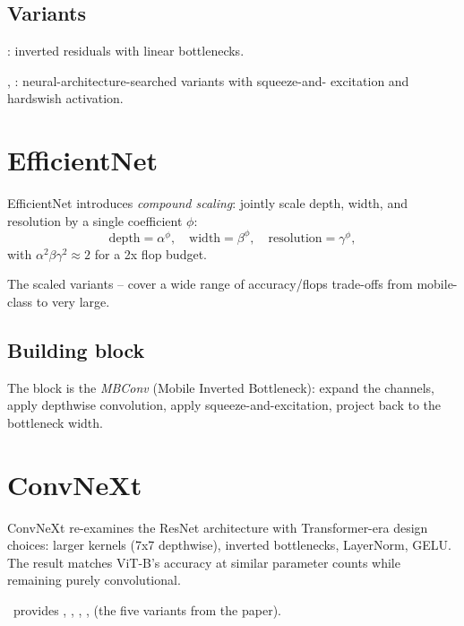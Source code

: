 \subsection{Variants}
\label{ssec:vision_cnn:mobilenet_variants}

: inverted residuals with linear bottlenecks.

, :
neural-architecture-searched variants with squeeze-and-
excitation and hardswish activation.

\section{EfficientNet}
\label{sec:vision_cnn:efficientnet}

EfficientNet \cite{tan_efficientnet_2019} introduces
\emph{compound scaling}: jointly scale depth, width, and
resolution by a single coefficient $\phi$:
\[
\text{depth} = \alpha^\phi, \quad
\text{width} = \beta^\phi, \quad
\text{resolution} = \gamma^\phi,
\]
with $\alpha^2 \beta \gamma^2 \approx 2$ for a 2x flop budget.

The scaled variants --
cover a wide range of accuracy/flops trade-offs from
mobile-class to very large.

\subsection{Building block}
\label{ssec:vision_cnn:efficientnet_block}

The block is the \emph{MBConv} (Mobile Inverted Bottleneck):
expand the channels, apply depthwise convolution, apply
squeeze-and-excitation, project back to the bottleneck width.

\section{ConvNeXt}
\label{sec:vision_cnn:convnext}

ConvNeXt \cite{liu_convnext_2022} re-examines the ResNet
architecture with Transformer-era design choices: larger
kernels (7x7 depthwise), inverted bottlenecks, LayerNorm,
GELU. The result matches ViT-B's accuracy at similar parameter
counts while remaining purely convolutional.

\Lucid\ provides , ,
, ,
 (the five variants from the paper).

